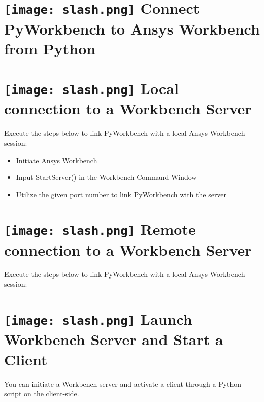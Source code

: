 \documentclass[9pt,landscape]{article}
\begin{document}
\begin{multicols}{3}
\setlength{\premulticols}{1pt}
\setlength{\postmulticols}{1pt}
\setlength{\multicolsep}{1pt}
\setlength{\columnsep}{2pt}

\vfill
\section{\texttt{[image: slash.png]} Connect PyWorkbench to Ansys Workbench from Python}


\section{\texttt{[image: slash.png]} Local connection to a Workbench Server}
Execute the steps below to link PyWorkbench with a local Ansys Workbench session:

\begin{itemize}
\item Initiate Ansys Workbench  
\item Input StartServer() in the Workbench Command Window 
\item Utilize the given port number to link PyWorkbench with the server
\end{itemize}    


\section{\texttt{[image: slash.png]} Remote connection to a Workbench Server}
Execute the steps below to link PyWorkbench with a local Ansys Workbench session:

\section{\texttt{[image: slash.png]} Launch Workbench Server and Start a Client}
You can initiate a Workbench server and activate a client through a Python script on the client-side.


\end{multicols}
\end{document}
